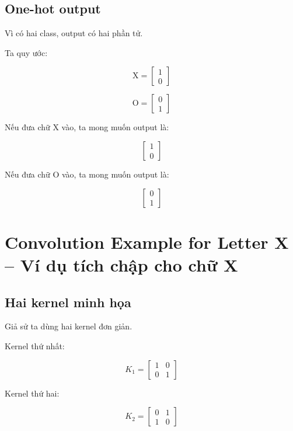 \subsection{One-hot output}

Vì có hai class, output có hai phần tử.

Ta quy ước:

\[
    \text{X}
    =
    \begin{bmatrix}
    1\\
    0
    \end{bmatrix}
\]

\[
    \text{O}
    =
    \begin{bmatrix}
    0\\
    1
    \end{bmatrix}
\]

Nếu đưa chữ X vào, ta mong muốn output là:

\[
    \begin{bmatrix}
    1\\
    0
    \end{bmatrix}
\]

Nếu đưa chữ O vào, ta mong muốn output là:

\[
    \begin{bmatrix}
    0\\
    1
    \end{bmatrix}
\]

\section{Convolution Example for Letter X -- Ví dụ tích chập cho chữ X}

\subsection{Hai kernel minh họa}

Giả sử ta dùng hai kernel đơn giản.

Kernel thứ nhất:

\[
    K_1 =
    \begin{bmatrix}
    1 & 0\\
    0 & 1
    \end{bmatrix}
\]

Kernel thứ hai:

\[
    K_2 =
    \begin{bmatrix}
    0 & 1\\
    1 & 0
    \end{bmatrix}
\]

